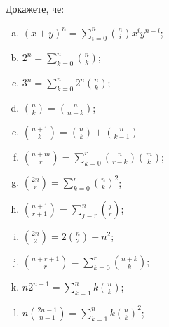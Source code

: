 \begin{prb}
  Докажете, че:
  \begin{enumerate}[a)]
  \item
    $(x+y)^n = \sum^{n}_{i=0}\binom{n}{i}x^iy^{n-i}$;
  \item
    $2^n = \sum^n_{k=0}\binom{n}{k}$;
  \item
    $3^n = \sum^n_{k=0}2^n\binom{n}{k}$;
  \item
    $\binom{n}{k} = \binom{n}{n-k}$;
  \item
    $\binom{n+1}{k} = \binom{n}{k} + \binom{n}{k-1}$
  \item 
    $\binom{n+m}{r} = \sum^r_{k=0}\binom{n}{r-k}\binom{m}{k}$;
  \item
    $\binom{2n}{r} = \sum^r_{k=0}\binom{n}{k}^2$;
  \item
    $\binom{n+1}{r+1} = \sum^n_{j=r}\binom{j}{r}$;
  \item
    $\binom{2n}{2} = 2\binom{n}{2} + n^2$;
  \item
    $\binom{n+r+1}{r} = \sum^r_{k=0}\binom{n+k}{k}$;
  \item
    $n2^{n-1} = \sum^{n}_{k=1} k\binom{n}{k}$;
  \item
    $n\binom{2n-1}{n-1} = \sum^{n}_{k=1}k\binom{n}{k}^2$;
  \end{enumerate}
\end{prb}



